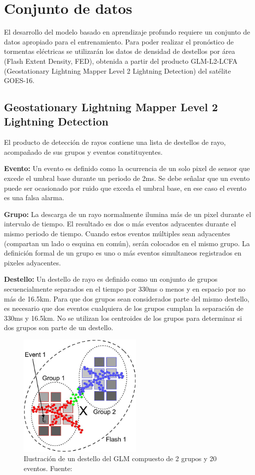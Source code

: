 \section{Conjunto de datos}

El desarrollo del modelo basado en aprendizaje profundo requiere un conjunto de 
datos apropiado para el entrenamiento.
Para poder realizar el pronóstico de tormentas eléctricas se utilizarán los
datos de densidad de destellos por área (Flash Extent Density, FED), obtenida a
partir del producto GLM-L2-LCFA (Geostationary Lightning Mapper Level 2
Lightning Detection) del satélite GOES-16.

\subsection{Geostationary Lightning Mapper Level 2 Lightning Detection}
El producto de detección de rayos contiene una lista de destellos de rayo, 
acompañado de sus grupos y eventos constituyentes.

\textbf{Evento: }Un evento es definido como la ocurrencia de un solo pixel de
sensor que excede el umbral base durante un periodo de 2ms.
Se debe señalar que un evento puede ser ocasionado por ruido que exceda el
umbral base, en ese caso el evento es una falsa alarma.

\textbf{Grupo: }La descarga de un rayo normalmente ilumina más de un pixel
durante el intervalo de tiempo.
El resultado es dos o más eventos adyacentes durante el mismo periodo de tiempo.
Cuando estos eventos múltiples sean adyacentes (compartan un lado o esquina en
común), serán colocados en el mismo grupo.
La definición formal de un grupo es uno o más eventos simultaneos registrados
en pixeles adyacentes.

\textbf{Destello: }Un destello de rayo es definido como un conjunto de grupos 
secuencialmente separados en el tiempo por 330ms o menos y en espacio por no 
más de 16.5km.
Para que dos grupos sean considerados parte del mismo destello, es necesario
que dos eventos cualquiera de los grupos cumplan la separación de 330ms y
16.5km.
No se utilizan los centroides de los grupos para determinar si dos grupos son
parte de un destello.

\begin{figure}[H]
  \centering
  \includegraphics[width=6cm]{E_IMAGENES/5_Metodologia/flash_group_event}
  \caption[Destello del GLM]{
    Ilustración de un destello del GLM compuesto de 2 grupos y 20 eventos.
    \newline
    Fuente:\citep{GOODMAN201334}
  }
  \label{fig:fed}
\end{figure}

